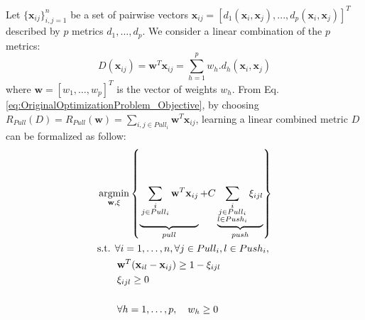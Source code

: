 \noindent Let $\{\textbf{x}_{ij}\}_{i,j=1}^n$ be a set of pairwise vectors $\textbf{x}_{ij}=[d_1(\textbf{x}_i,\textbf{x}_j), ..., d_p(\textbf{x}_i,\textbf{x}_j)]^T$  described by $p$ metrics $d_1, \ldots, d_p$. We consider a linear combination of the $p$ metrics:
\begin{equation}
D(\textbf{x}_{ij})=\textbf{w}^T\textbf{x}_{ij} = \sum_{h=1}^p w_h.d_h(\textbf{x}_i,\textbf{x}_j)
\label{eq:D_linear}
\end{equation}
where $\textbf{w}=[w_1, \ldots, w_p]^T$ is the vector of weights $w_h$. From Eq. \ref{eq:OriginalOptimizationProblem_Objective}, by choosing $R_{Pull}(D) = R_{Pull}(\textbf{w}) = \sum\limits_{i, j \in Pull_i} \textbf{w}^T\textbf{x}_{ij}$, learning a linear combined metric $D$ can be formalized as follow:
\begin{align}
		&\displaystyle 		\argmin_{\textbf{w},\xi}
		\left\lbrace \underbrace{
		\vphantom{ \sum\limits_{\substack{i \\ j \in Pull_i \\ l \in Push_i}} \xi_{ijl} }
			\sum\limits_{\substack{i \\ j \in Pull_i}} \textbf{w}^T\textbf{x}_{ij}
		}_{pull}					
		+	
		C \underbrace{				
			\sum\limits_{\substack{i \\ j \in Pull_i \\ l \in Push_i}}  \xi_{ijl}
		}_{push} \right\rbrace \nonumber \\
 		&\text{s.t.  } \forall i = 1, \ldots, n, \forall j \in Pull_i, l \in Push_i, \label{eq:MMLPrimal} \\
		& \qquad \textbf{w}^T(\textbf{x}_{il}-\textbf{x}_{ij}) \geq 1-\xi_{ijl}  \nonumber \\
		& \qquad \xi_{ijl} \geq 0 \nonumber \\
		& \nonumber \\
		& \qquad \forall h=1, \ldots, p, \quad w_h \geq 0 \label{eq:MMLPrimal_constraint_pos}
\end{align}


